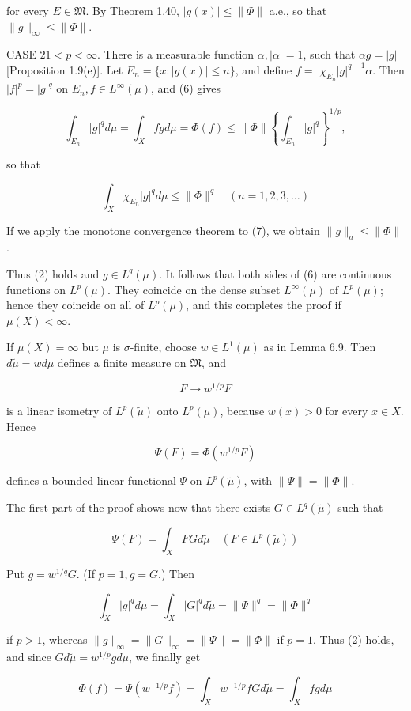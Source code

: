 \documentclass[10pt]{article}
\begin{document}
for every $E \in \mathfrak{M}$. By Theorem 1.40, $|g(x)| \leq\|\Phi\|$ a.e., so that $\|g\|_{\infty} \leq\|\Phi\|$.

CASE $21<p<\infty$. There is a measurable function $\alpha,|\alpha|=1$, such that $\alpha g=|g|$ [Proposition 1.9(e)]. Let $E_{n}=\{x:|g(x)| \leq n\}$, and define $f=$ $\chi_{E_{n}}|g|^{q-1} \alpha$. Then $|f|^{p}=|g|^{q}$ on $E_{n}, f \in L^{\infty}(\mu)$, and (6) gives

$$
\int_{E_{n}}|g|^{q} d \mu=\int_{X} f g d \mu=\Phi(f) \leq\|\Phi\|\left\{\int_{E_{n}}|g|^{q}\right\}^{1 / p},
$$

so that

$$
\int_{X} \chi_{E_{n}}|g|^{q} d \mu \leq\|\Phi\|^{q} \quad(n=1,2,3, \ldots)
$$

If we apply the monotone convergence theorem to (7), we obtain $\|g\|_{a} \leq\|\Phi\|$.

Thus (2) holds and $g \in L^{q}(\mu)$. It follows that both sides of (6) are continuous functions on $L^{p}(\mu)$. They coincide on the dense subset $L^{\infty}(\mu)$ of $L^{p}(\mu)$; hence they coincide on all of $L^{p}(\mu)$, and this completes the proof if $\mu(X)<\infty$.

If $\mu(X)=\infty$ but $\mu$ is $\sigma$-finite, choose $w \in L^{1}(\mu)$ as in Lemma 6.9. Then $d \tilde{\mu}=w d \mu$ defines a finite measure on $\mathfrak{M}$, and

$$
F \rightarrow w^{1 / p} F
$$

is a linear isometry of $L^{p}(\tilde{\mu})$ onto $L^{p}(\mu)$, because $w(x)>0$ for every $x \in X$. Hence

$$
\Psi(F)=\Phi\left(w^{1 / p} F\right)
$$

defines a bounded linear functional $\Psi$ on $L^{p}(\tilde{\mu})$, with $\|\Psi\|=\|\Phi\|$.

The first part of the proof shows now that there exists $G \in L^{q}(\tilde{\mu})$ such that

$$
\Psi(F)=\int_{X} F G d \tilde{\mu} \quad\left(F \in L^{p}(\tilde{\mu})\right)
$$

Put $g=w^{1 / q} G$. (If $p=1, g=G$.) Then

$$
\int_{X}|g|^{q} d \mu=\int_{X}|G|^{q} d \tilde{\mu}=\|\Psi\|^{q}=\|\Phi\|^{q}
$$

if $p>1$, whereas $\|g\|_{\infty}=\|G\|_{\infty}=\|\Psi\|=\|\Phi\|$ if $p=1$. Thus (2) holds, and since $G d \tilde{\mu}=w^{1 / p} g d \mu$, we finally get

$$
\Phi(f)=\Psi\left(w^{-1 / p} f\right)=\int_{X} w^{-1 / p} f G d \tilde{\mu}=\int_{X} f g d \mu
$$
\end{document}
